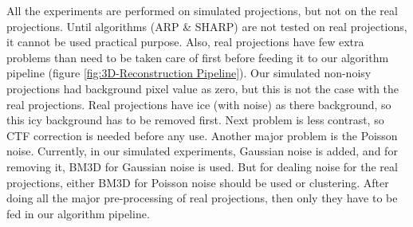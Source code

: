 \documentclass[twoside]{iitbreport}
\begin{document}
All the experiments are performed on simulated projections, but not on the real projections. Until algorithms  (ARP \& SHARP) are not tested on real projections, it cannot be used practical purpose. Also, real projections have few extra problems than need to be taken care of first before feeding it to our algorithm pipeline (figure \ref{fig:3D-Reconstruction Pipeline}). Our simulated non-noisy projections had background pixel value as zero, but this is not the case with the real projections. Real projections have ice (with noise) as there background, so this icy background has to be removed first. Next problem is less contrast, so CTF correction is needed before any use.
Another major problem is the Poisson noise. Currently, in our simulated experiments, Gaussian noise is added, and for removing it, BM3D for Gaussian noise is used. But for dealing noise for the real projections, either BM3D for Poisson noise should be used or clustering. After doing all the major pre-processing of real projections, then only they have to be fed in our algorithm pipeline.    















     


           
\end{document}
